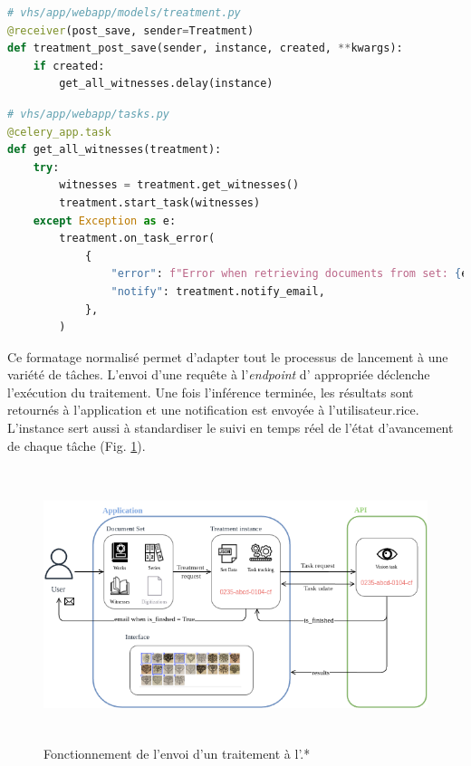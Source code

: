 \begin{lstlisting}[language=python, frame=single, breaklines=true, caption={Création d'une tâche à la création d'un \tr.}]
# vhs/app/webapp/models/treatment.py
@receiver(post_save, sender=Treatment)
def treatment_post_save(sender, instance, created, **kwargs):
    if created:
        get_all_witnesses.delay(instance)
\end{lstlisting}

\begin{lstlisting}[language=python, frame=single, breaklines=true, caption={Tâche qui rassemble les \wits et lance l'action sur les documents.}]
# vhs/app/webapp/tasks.py
@celery_app.task
def get_all_witnesses(treatment):
    try:
        witnesses = treatment.get_witnesses()
        treatment.start_task(witnesses)
    except Exception as e:
        treatment.on_task_error(
            {
                "error": f"Error when retrieving documents from set: {e}",
                "notify": treatment.notify_email,
            },
        )
\end{lstlisting}

Ce formatage normalisé permet d'adapter tout le processus de lancement
à une variété de tâches. L'envoi d'une requête \http à l'\textit{endpoint} d'\api
appropriée déclenche l'exécution du traitement. Une fois l'inférence
terminée, les résultats sont retournés à l'application et une
notification est envoyée à l'utilisateur.rice. L'instance \tr sert
aussi à standardiser le suivi en temps réel de l'état d'avancement de
chaque tâche (Fig. \ref{fig:treatment}).

\begin{figure}[H]
          \begin{center}
          \includegraphics[height=8cm]{figues/treatment.png}
          \end{center}
          \caption{Fonctionnement de l'envoi d'un traitement à l'\api.*\protect\footnotemark}
          \label{fig:treatment} \end{figure}

